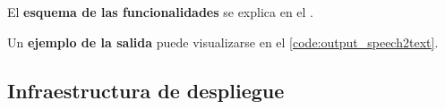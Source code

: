 \documentclass[../main.tex]{subfiles}
\begin{document}
El \textbf{esquema de las funcionalidades} se explica en el .

Un \textbf{ejemplo de la salida} puede visualizarse en el \autoref{code:output_speech2text}.



\subsection{Infraestructura de despliegue}\label{subsec:impl_infraestructura}
\end{document}
